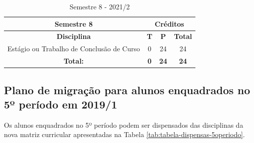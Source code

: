 
\begin{table}[H]
\caption{Semestre 8  - 2021/2}
\centering
\footnotesize
\begin{tabular}{|c|c|c|c|} %
\hline
\hline
\multicolumn{1}{|c|}{\textbf{Semestre 8}}  &  \multicolumn{3}{|c|}{\textbf{Créditos}} \\
\hline
\hline
\textbf{Disciplina} &  \textbf{T}  &  \textbf{P}  & \textbf{Total} \\ 
\hline 

Estágio ou Trabalho de Conclusão de Curso & 0 & 24 & 24 \\

\hline

\hline

\textbf{Total:}  &  \textbf{0}  &  \textbf{24}   & \textbf{24} \\ 

\hline
\hline
\end{tabular}
\label{tab:migracao}
\end{table}

\doublespacing

\newpage

\subsection{Plano de migração para alunos enquadrados no 5º período em 2019/1}\label{sec:migracao2}

Os alunos enquadrados no 5º período podem ser dispensados das disciplinas da nova matriz curricular apresentadas na Tabela \ref{tab:tabela-dispensas-5operiodo}.


\singlespacing

